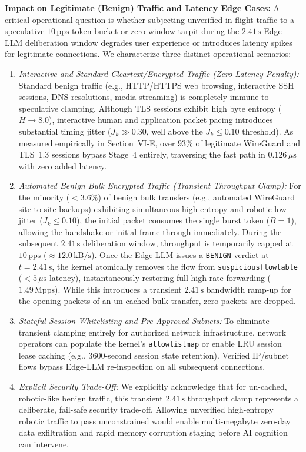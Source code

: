 \documentclass[journal]{IEEEtran}
\renewcommand{\_}{\textunderscore\allowbreak}
\begin{document}
\textbf{Impact on Legitimate (Benign) Traffic and Latency Edge Cases:}
A critical operational question is whether subjecting unverified in-flight traffic to a speculative $10\,\text{pps}$ token bucket or zero-window tarpit during the $2.41\,\text{s}$ Edge-LLM deliberation window degrades user experience or introduces latency spikes for legitimate connections. We characterize three distinct operational scenarios:
\begin{enumerate}
  \item \textit{Interactive and Standard Cleartext/Encrypted Traffic (Zero Latency Penalty):} Standard benign traffic (e.g., HTTP/HTTPS web browsing, interactive SSH sessions, DNS resolutions, media streaming) is completely immune to speculative clamping. Although TLS sessions exhibit high byte entropy ($H \to 8.0$), interactive human and application packet pacing introduces substantial timing jitter ($J_k \gg 0.30$, well above the $J_k \le 0.10$ threshold). As measured empirically in Section~VI-E, over $93\%$ of legitimate WireGuard and TLS~1.3 sessions bypass Stage~4 entirely, traversing the fast path in $0.126\,\mu\text{s}$ with zero added latency.
  \item \textit{Automated Benign Bulk Encrypted Traffic (Transient Throughput Clamp):} For the minority ($< 3.6\%$) of benign bulk transfers (e.g., automated WireGuard site-to-site backups) exhibiting simultaneous high entropy and robotic low jitter ($J_k \le 0.10$), the initial packet consumes the single burst token ($B=1$), allowing the handshake or initial frame through immediately. During the subsequent $2.41\,\text{s}$ deliberation window, throughput is temporarily capped at $10\,\text{pps}$ ($\approx 12.0\,\text{kB/s}$). Once the Edge-LLM issues a \texttt{BENIGN} verdict at $t = 2.41\,\text{s}$, the kernel atomically removes the flow from \texttt{suspicious\_flow\_table} ($< 5\,\mu\text{s}$ latency), instantaneously restoring full high-rate forwarding ($1.49\,\text{Mpps}$). While this introduces a transient $2.41\,\text{s}$ bandwidth ramp-up for the opening packets of an un-cached bulk transfer, zero packets are dropped.
  \item \textit{Stateful Session Whitelisting and Pre-Approved Subnets:} To eliminate transient clamping entirely for authorized network infrastructure, network operators can populate the kernel's \texttt{allowlist\_map} or enable LRU session lease caching (e.g., 3600-second session state retention). Verified IP/subnet flows bypass Edge-LLM re-inspection on all subsequent connections.
  \item \textit{Explicit Security Trade-Off:} We explicitly acknowledge that for un-cached, robotic-like benign traffic, this transient $2.41\,\text{s}$ throughput clamp represents a deliberate, fail-safe security trade-off. Allowing unverified high-entropy robotic traffic to pass unconstrained would enable multi-megabyte zero-day data exfiltration and rapid memory corruption staging before AI cognition can intervene.
\end{enumerate}
\end{document}
